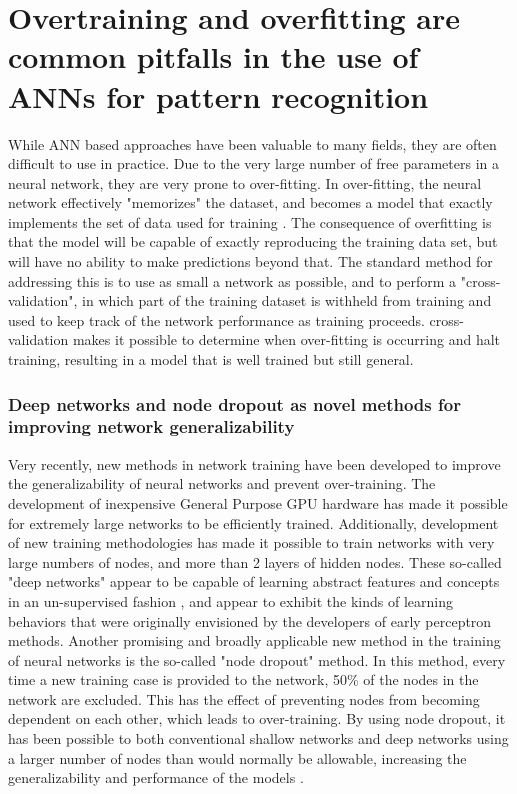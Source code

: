 \section{Overtraining and overfitting are common pitfalls in the use of \ac{ANN}s for pattern recognition}
\label{sec:intro_overtraining}
While \ac{ANN} based approaches have been valuable to many fields, they are often difficult to use in practice.
Due to the very large number of free parameters in a neural network, they are very prone to over-fitting.
In over-fitting, the neural network effectively "memorizes" the dataset, and becomes a model that exactly implements the set of data used for training \citep{Tetko:1995cm}.
The consequence of overfitting is that the model will be capable of exactly reproducing the training data set, but will have no ability to make predictions beyond that.
The standard method for addressing this is to use as small a network as possible, and to perform a "cross-validation", in which part of the training dataset is withheld from training and used to keep track of the network performance as training proceeds.
cross-validation makes it possible to determine when over-fitting is occurring and halt training, resulting in a model that is well trained but still general.

\subsubsection{Deep networks and node dropout as novel methods for improving network generalizability}
Very recently, new methods in network training have been developed to improve the generalizability of neural networks and prevent over-training.
The development of inexpensive General Purpose \ac{GPU} hardware has made it possible for extremely large networks to be efficiently trained. 
Additionally, development of new training methodologies \citep{Hinton:2006dy} has made it possible to train networks with very large numbers of nodes, and more than 2 layers of hidden nodes.
These so-called "deep networks" appear to be capable of learning abstract features and concepts in an un-supervised fashion \citep{Le:2013kz}, and appear to exhibit the kinds of learning behaviors that were originally envisioned by the developers of early perceptron methods. 
Another promising and broadly applicable new method in the training of neural networks is the so-called "node dropout" method.
In this method, every time a new training case is provided to the network, 50\% of the nodes in the network are excluded.
This has the effect of preventing nodes from becoming dependent on each other, which leads to over-training.
By using node dropout, it has been possible to both conventional shallow networks and deep networks using a larger number of nodes than would normally be allowable, increasing the generalizability and performance of the models \citep{Hinton:2012tv}.

